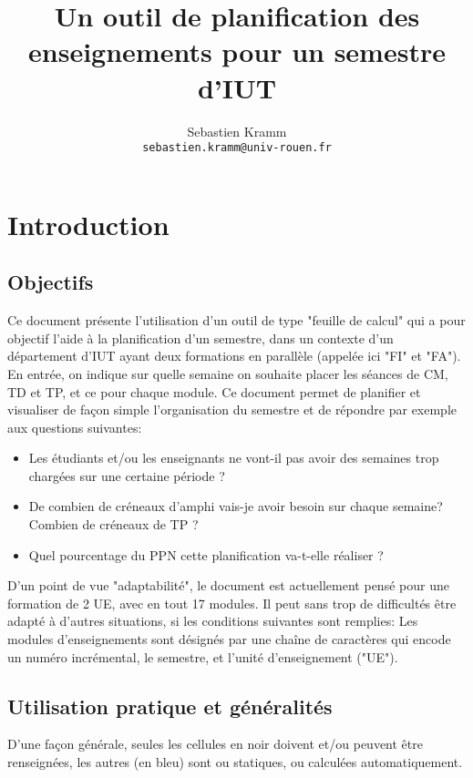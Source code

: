\documentclass[12pt,a4paper]{article}
\author{Sebastien Kramm\\{\tt sebastien.kramm@univ-rouen.fr}}
\title{Un outil de planification des enseignements pour un semestre d'IUT}
\begin{document}
\maketitle

\section{Introduction}

\subsection{Objectifs}

Ce document présente l'utilisation d'un outil de type "feuille de calcul" qui a pour objectif l'aide à la planification d'un semestre, dans un contexte d'un département d'IUT ayant deux formations en parallèle (appelée ici "FI" et "FA").
En entrée, on indique sur quelle semaine on souhaite placer les séances de CM, TD et TP, et ce pour chaque module.
Ce document permet de planifier et visualiser de façon simple l'organisation du semestre et de répondre par exemple aux questions suivantes:

\begin{itemize}
\item Les étudiants et/ou les enseignants ne vont-il pas avoir des semaines trop chargées sur une certaine période ?
\item De combien de créneaux d'amphi vais-je avoir besoin sur chaque semaine?
Combien de créneaux de TP ?
\item Quel pourcentage du PPN cette planification va-t-elle réaliser ?
\end{itemize}

D'un point de vue "adaptabilité", le document est actuellement pensé pour une formation de 2 UE, avec en tout 17 modules.
Il peut sans trop de difficultés être adapté à d'autres situations, si les conditions suivantes sont remplies:
Les modules d'enseignements sont désignés par une chaîne de caractères qui encode un numéro incrémental, le semestre, et l'unité d'enseignement ("UE").


\subsection{Utilisation pratique et généralités}


D'une façon générale, seules les cellules en noir doivent et/ou peuvent être renseignées, les autres (en bleu) sont ou statiques, ou calculées automatiquement.
\end{document}
